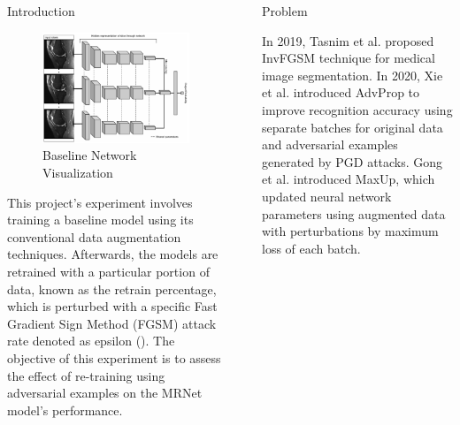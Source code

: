 \documentclass[final]{beamer}
\newlength{\sepwidth}
\newlength{\colwidth}
\newcommand{\separatorcolumn}{\begin{column}{\sepwidth}\end{column}}
\begin{document}
\begin{frame}[t]
\begin{columns}[t]
\begin{column}{\colwidth}
\begin{block}{Introduction}
    \begin{figure}[!htp]
    \centering
    \includegraphics[width=1\textwidth]{mrnet.png}
    \caption{\label{fig:dataset}Baseline Network Visualization}
    \end{figure}

    This project's experiment involves training a baseline model using its conventional data augmentation techniques. Afterwards, the models are retrained with a particular portion of data, known as the retrain percentage, which is perturbed with a specific Fast Gradient Sign Method (FGSM) attack rate denoted as epsilon (\epsilon). The objective of this experiment is to assess the effect of re-training using adversarial examples on the MRNet model's performance.

    
  \end{block}

 

\end{column}

\separatorcolumn

\begin{column}{\colwidth}

  \begin{block}{Problem}

    In 2019, Tasnim et al. proposed InvFGSM technique for medical image segmentation. In 2020, Xie et al. introduced AdvProp to improve recognition accuracy using separate batches for original data and adversarial examples generated by PGD attacks. Gong et al. introduced MaxUp, which updated neural network parameters using augmented data with perturbations by maximum loss of each batch. 


\end{block}
\end{column}
\end{columns}
\end{frame}
\end{document}
